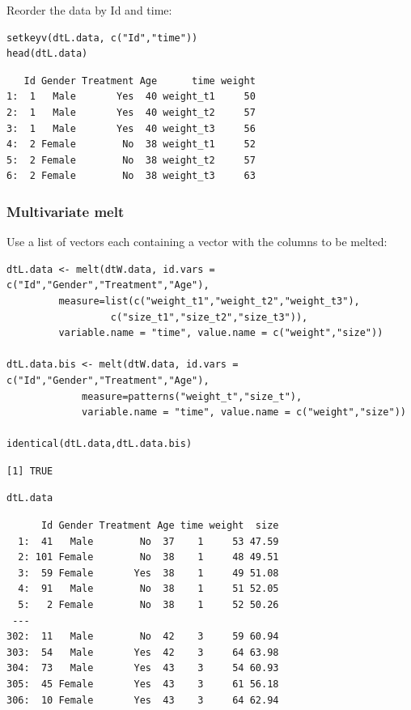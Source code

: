 \documentclass{article}
\begin{document}
Reorder the data by Id and time:
\lstset{language=r,label= ,caption= ,captionpos=b,numbers=none}
\begin{lstlisting}
setkeyv(dtL.data, c("Id","time"))
head(dtL.data)
\end{lstlisting}

\begin{verbatim}
   Id Gender Treatment Age      time weight
1:  1   Male       Yes  40 weight_t1     50
2:  1   Male       Yes  40 weight_t2     57
3:  1   Male       Yes  40 weight_t3     56
4:  2 Female        No  38 weight_t1     52
5:  2 Female        No  38 weight_t2     57
6:  2 Female        No  38 weight_t3     63
\end{verbatim}

\clearpage

\subsubsection{Multivariate melt}
\label{sec:org7397789}

Use a list of vectors each containing a vector with the columns to be
melted:
\lstset{language=r,label= ,caption= ,captionpos=b,numbers=none}
\begin{lstlisting}
dtL.data <- melt(dtW.data, id.vars = c("Id","Gender","Treatment","Age"), 
		 measure=list(c("weight_t1","weight_t2","weight_t3"), 
			      c("size_t1","size_t2","size_t3")),
		 variable.name = "time", value.name = c("weight","size"))

dtL.data.bis <- melt(dtW.data, id.vars = c("Id","Gender","Treatment","Age"), 
		     measure=patterns("weight_t","size_t"),
		     variable.name = "time", value.name = c("weight","size"))

identical(dtL.data,dtL.data.bis)
\end{lstlisting}

\begin{verbatim}
[1] TRUE
\end{verbatim}

\lstset{language=r,label= ,caption= ,captionpos=b,numbers=none}
\begin{lstlisting}
dtL.data
\end{lstlisting}

\begin{verbatim}
      Id Gender Treatment Age time weight  size
  1:  41   Male        No  37    1     53 47.59
  2: 101 Female        No  38    1     48 49.51
  3:  59 Female       Yes  38    1     49 51.08
  4:  91   Male        No  38    1     51 52.05
  5:   2 Female        No  38    1     52 50.26
 ---                                           
302:  11   Male        No  42    3     59 60.94
303:  54   Male       Yes  42    3     64 63.98
304:  73   Male       Yes  43    3     54 60.93
305:  45 Female       Yes  43    3     61 56.18
306:  10 Female       Yes  43    3     64 62.94
\end{verbatim}
\end{document}
